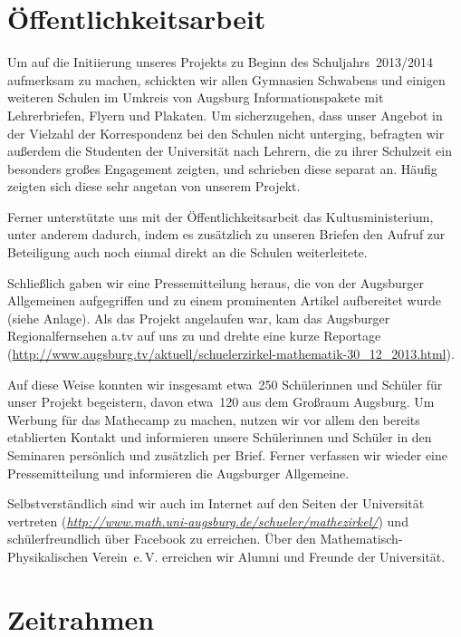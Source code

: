 \documentclass[12pt]{zettel}
\begin{document}
\section{Öffentlichkeitsarbeit}

Um auf die Initiierung unseres Projekts zu Beginn des Schuljahrs~2013/2014
aufmerksam zu machen, schickten wir allen Gymnasien Schwabens und einigen
weiteren Schulen im Umkreis von Augsburg Informationspakete mit Lehrerbriefen,
Flyern und Plakaten. Um sicherzugehen, dass unser Angebot in der
Vielzahl der Korrespondenz bei den Schulen nicht unterging, befragten wir außerdem
die Studenten der Universität nach Lehrern, die zu ihrer Schulzeit ein
besonders großes Engagement zeigten, und schrieben diese separat an.
Häufig zeigten sich diese sehr angetan von unserem Projekt.

Ferner unterstützte uns mit der Öffentlichkeitsarbeit das Kultusministerium,
unter anderem dadurch, indem es zusätzlich zu unseren Briefen den Aufruf zur
Beteiligung auch noch einmal direkt an die Schulen weiterleitete.

Schließlich gaben wir eine Pressemitteilung heraus, die von der
Augsburger Allgemeinen aufgegriffen und zu einem prominenten Artikel aufbereitet
wurde (siehe Anlage). Als das Projekt angelaufen war, kam das Augsburger
Regionalfernsehen a.tv auf uns zu und drehte eine kurze Reportage
(\href{http://www.augsburg.tv/aktuell/schuelerzirkel-mathematik-30_12_2013.html}{\textsf{http:/\!/www.augsburg.tv/aktuell/schuelerzirkel-mathematik-30\_{}12\_{}2013.html}}).

Auf diese Weise konnten wir insgesamt etwa~250 Schülerinnen und Schüler für
unser Projekt begeistern, davon etwa~120 aus dem Großraum Augsburg. Um Werbung für
das Mathecamp zu machen, nutzen wir vor allem den bereits etablierten Kontakt
und informieren unsere Schülerinnen und Schüler in den Seminaren persönlich und
zusätzlich per Brief. Ferner verfassen wir wieder eine Pressemitteilung und
informieren die Augsburger Allgemeine.

Selbstverständlich sind wir auch im Internet auf den Seiten der Universität
vertreten
(\href{http://www.math.uni-augsburg.de/schueler/mathezirkel/}{\textsl{http:/\!/www.math.uni-augsburg.de/schueler/mathezirkel/}})
und schülerfreundlich über Facebook zu erreichen. Über den
Mathematisch-Physikalischen Verein~e.\,V. erreichen wir Alumni und Freunde der
Universität.


\section{Zeitrahmen}
\end{document}
